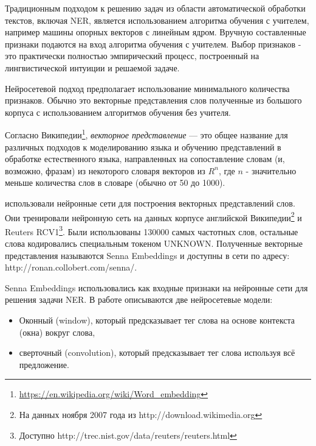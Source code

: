   Традиционным подходом к решению задач из области автоматической обработки текстов,
  включая NER, является использованием алгоритма обучения с учителем, например
  машины опорных векторов с линейным ядром. Вручную составленные признаки подаются на вход
  алгоритма обучения с учителем. Выбор признаков - это практически полностью эмпирический
  процесс, построенный на лингвистической интуиции и решаемой задаче.

  Нейросетевой подход предполагает использование минимального количества признаков.
  Обычно это векторные представления слов полученные из большого корпуса с использованием
  алгоритмов обучения без учителя.


  Согласно Википедии\footnote{\url{https://en.wikipedia.org/wiki/Word_embedding}},
  \textit{векторное представление} — это общее название для различных
  подходов к моделированию языка и обучению представлений в обработке естественного языка,
  направленных на сопоставление словам (и, возможно, фразам) из некоторого словаря
  векторов из $R^n$, где $n$ - значительно меньше количества слов в словаре (обычно от 50 до 1000).

  \citep{collobert2011natural} использовали нейронные сети для построения векторных представлений слов.
  Они тренировали нейронную сеть на данных корпусе английской
  Википедии\footnote{На данных ноября 2007 года из http://download.wikimedia.org}
  и Reuters RCV1\footnote{Доступно http://trec.nist.gov/data/reuters/reuters.html}.
  Были использованы 130000 самых частотных слов, остальные слова кодировались
  специальным токеном UNKNOWN.
  Полученные векторные представления называются Senna Embeddings и доступны в сети
  по адресу: http://ronan.collobert.com/senna/.

  Senna Embeddings использовались как входные признаки на нейронные сети для решения задачи NER.
  В работе \citep{collobert2011natural} описываются две нейросетевые модели:
  \begin{itemize}
  \item Оконный (window), который предсказывает тег слова на основе контекста (окна) вокруг слова,
  \item сверточный (convolution), который предсказывает тег слова используя всё предложение.
  \end{itemize}


